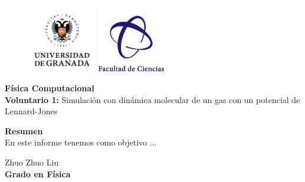\documentclass[11pt, twoside]{article} %
\begin{document}
\begin{figure}[h!]
	\includegraphics[width=3cm]{Icons/ugr.jpg}
	\endminipage
	\includegraphics[height = 2.5cm, width=3cm]{Icons/facultad_ciencias.png}
	\endminipage
\end{figure}

\vspace{0.3cm}

\begin{center}
    \Huge \textbf{Física Computacional}\\
    		\vspace{0.4cm}
    \LARGE \textbf{Voluntario 1:}  
    Simulación con dinámica molecular de un gas con un potencial de Lennard-Jones
\end{center}

\vspace{1cm}

\vspace{1cm}

\begin{center}
    \large \textbf{Resumen}\\
    		\vspace{0.2cm}
    \normalsize
    En este informe tenemos como objetivo ...

\end{center}

\vspace{1cm}

\begin{flushright}
    \large Zhuo Zhuo Liu 
    \\
    \vspace{0.4cm}
    \textbf{Grado en Física}
\end{flushright}

\newpage

\setcounter{page}{0}
\tableofcontents
\newpage
\end{document}
